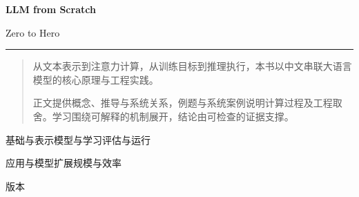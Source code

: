 \ifodd\value{page}
  \null\thispagestyle{empty}\newpage
\fi
\thispagestyle{empty}
\vspace*{30mm}
\begin{center}
{\LARGE\bfseries LLM from Scratch\par}
\vspace{5mm}
{\Large Zero to Hero\par}
\vspace{14mm}
\rule{0.66\textwidth}{0.6pt}\par
\end{center}
\vspace{14mm}
\begin{quotation}
从文本表示到注意力计算，从训练目标到推理执行，本书以中文串联大语言模型的核心原理与工程实践。

正文提供概念、推导与系统关系，例题与系统案例说明计算过程及工程取舍。学习围绕可解释的机制展开，结论由可检查的证据支撑。
\end{quotation}
\vfill
\begin{center}
基础与表示\quad 模型与学习\quad 评估与运行\par
\medskip
应用与模型扩展\quad 规模与效率\par
\vspace{18mm}
{\small \bookedition\quad 版本 \bookversion\par}
\end{center}
\clearpage
